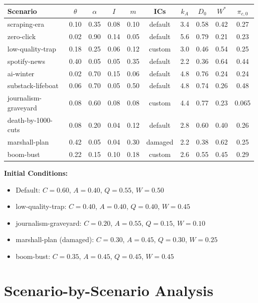 \documentclass[11pt]{article}
\begin{document}
\begin{table}[htbp]
\centering
\small
\begin{tabular}{lccccccccc}
\toprule
\textbf{Scenario} & $\theta$ & $\alpha$ & $I$ & $m$ & \textbf{ICs} & $k_A$ & $D_0$ & $W^*$ & $\pi_{c,0}$ \\
\midrule
scraping-era & 0.10 & 0.35 & 0.08 & 0.10 & default & 3.4 & 0.58 & 0.42 & 0.27 \\
zero-click & 0.02 & 0.90 & 0.14 & 0.05 & default & 5.6 & 0.79 & 0.21 & 0.23 \\
low-quality-trap & 0.18 & 0.25 & 0.06 & 0.12 & custom & 3.0 & 0.46 & 0.54 & 0.25 \\
spotify-news & 0.40 & 0.05 & 0.05 & 0.35 & default & 2.2 & 0.36 & 0.64 & 0.44 \\
ai-winter & 0.02 & 0.70 & 0.15 & 0.06 & default & 4.8 & 0.76 & 0.24 & 0.24 \\
substack-lifeboat & 0.06 & 0.70 & 0.05 & 0.50 & default & 4.8 & 0.74 & 0.26 & 0.48 \\
journalism-graveyard & 0.08 & 0.60 & 0.08 & 0.08 & custom & 4.4 & 0.77 & 0.23 & 0.065 \\
death-by-1000-cuts & 0.08 & 0.20 & 0.04 & 0.12 & default & 2.8 & 0.60 & 0.40 & 0.26 \\
marshall-plan & 0.42 & 0.05 & 0.04 & 0.30 & damaged & 2.2 & 0.38 & 0.62 & 0.25 \\
boom-bust & 0.22 & 0.15 & 0.10 & 0.18 & custom & 2.6 & 0.55 & 0.45 & 0.29 \\
\bottomrule
\end{tabular}
\end{table}

\textbf{Initial Conditions:}
\begin{itemize}
    \item Default: $C=0.60$, $A=0.40$, $Q=0.55$, $W=0.50$
    \item low-quality-trap: $C=0.40$, $A=0.40$, $Q=0.40$, $W=0.45$
    \item journalism-graveyard: $C=0.20$, $A=0.55$, $Q=0.15$, $W=0.10$
    \item marshall-plan (damaged): $C=0.30$, $A=0.45$, $Q=0.30$, $W=0.25$
    \item boom-bust: $C=0.35$, $A=0.45$, $Q=0.45$, $W=0.45$
\end{itemize}

\section{Scenario-by-Scenario Analysis}
\end{document}
